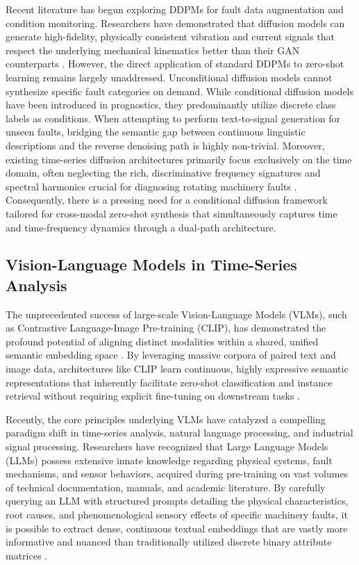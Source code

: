 Recent literature has begun exploring DDPMs for fault data augmentation and condition monitoring. Researchers have demonstrated that diffusion models can generate high-fidelity, physically consistent vibration and current signals that respect the underlying mechanical kinematics better than their GAN counterparts \cite{fan2025lightweight,yang2024novel}. However, the direct application of standard DDPMs to zero-shot learning remains largely unaddressed. Unconditional diffusion models cannot synthesize specific fault categories on demand. While conditional diffusion models have been introduced in prognostics, they predominantly utilize discrete class labels as conditions. When attempting to perform text-to-signal generation for unseen faults, bridging the semantic \cite{mikolov2013efficient} gap between continuous linguistic descriptions and the reverse denoising path is highly non-trivial. Moreover, existing time-series diffusion architectures primarily focus exclusively on the time domain, often neglecting the rich, discriminative frequency signatures and spectral harmonics crucial for diagnosing rotating machinery faults \cite{guo2025bearing}. Consequently, there is a pressing need for a conditional diffusion framework tailored for cross-modal zero-shot synthesis that simultaneously captures time and time-frequency dynamics through a dual-path architecture.

\subsection{Vision-Language Models in Time-Series Analysis}

The unprecedented success of large-scale Vision-Language Models (VLMs), such as Contrastive Language-Image Pre-training (CLIP), has demonstrated the profound potential of aligning distinct modalities within a shared, unified semantic \cite{mikolov2013efficient} embedding space \cite{mikolov2013efficient}. By leveraging massive corpora of paired text and image data, architectures like CLIP learn continuous, highly expressive semantic \cite{radford2021learning} representations that inherently facilitate zero-shot classification and instance retrieval without requiring explicit fine-tuning on downstream tasks \cite{radford2021learning}.

Recently, the core principles underlying VLMs have catalyzed a compelling paradigm shift in time-series analysis, natural language processing, and industrial signal processing. Researchers have recognized that Large Language Models (LLMs) \cite{brown2020language,devlin2019bert} possess extensive innate knowledge regarding physical systems, fault mechanisms, and sensor behaviors, acquired during pre-training on vast volumes of technical documentation, manuals, and academic literature. By carefully querying an LLM with structured prompts detailing the physical characteristics, root causes, and phenomenological sensory effects of specific machinery faults, it is possible to extract dense, continuous textual embeddings that are vastly more informative and nuanced than traditionally utilized discrete binary attribute matrices \cite{brown2020language}.

